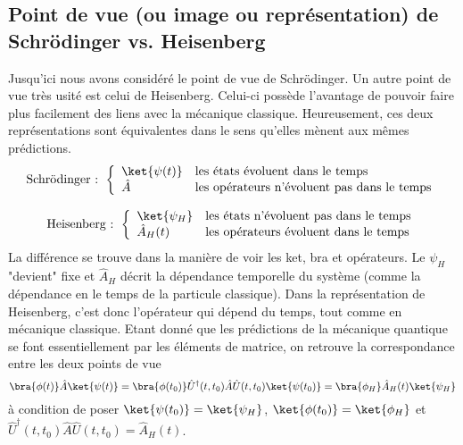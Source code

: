 	\subsection{Point de vue (ou image ou représentation) de Schrödinger vs. Heisenberg}
	Jusqu'ici nous avons considéré le point de vue de Schrödinger.
	Un autre point de vue très usité est celui de Heisenberg. Celui-ci possède l'avantage de pouvoir
	faire plus facilement des liens avec la mécanique classique.
	Heureusement, ces deux représentations sont équivalentes dans le sens qu'elles
	mènent aux mêmes prédictions.
	\begin{equation}
	\text{Schrödinger : }\left\{\begin{array}{ll}
	\ket{\psi(t)} & \text{les états évoluent dans le temps}\\
	\hat{A} & \text{les opérateurs n'évoluent pas dans le temps}	
	\end{array}\right.
	\end{equation}
	
	\begin{equation}
	\text{Heisenberg : }\left\{\begin{array}{ll}
	\ket{\psi_H} & \text{les états n'évoluent pas dans le temps}\\
	\hat{A}_H(t) & \text{les opérateurs évoluent dans le temps}	
	\end{array}\right.
	\end{equation}	
	La différence se trouve dans la manière de voir les ket, bra et opérateurs.
	Le $\psi_H$ "devient" fixe et $\hat{A}_H$ décrit la dépendance temporelle du système
	(comme la dépendance en le temps de la particule classique). Dans la représentation
	de Heisenberg, c'est donc l'opérateur qui dépend du temps, tout comme en mécanique 
	classique. Etant donné que les prédictions de la mécanique quantique se font
	essentiellement par les éléments de matrice, on retrouve la correspondance entre les
	deux points de vue
	\begin{equation}
	\bra{\phi(t)}\hat{A}\ket{\psi(t)} = \bra{\phi(t_0)}\hat{U}^\dagger(t,t_0)\hat{A}\hat{U}(t,t_0)\ket{\psi(t_0)} 
	= \bra{\phi_H}\hat{A}_H(t)\ket{\psi_H}
	\end{equation}
	à condition de poser $\ket{\psi(t_0)} = \ket{\psi_H}$, $\ket{\phi(t_0)} = \ket{\phi_H}$ et
	 $\hat{U}^\dagger(t,t_0)\hat{A}\hat{U}(t,t_0) = \hat{A}_H(t)$.
	
 

